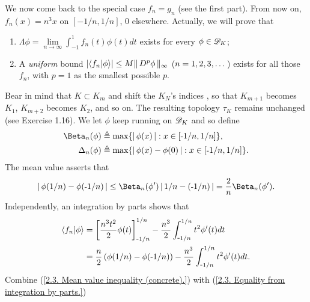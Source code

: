 We now come back to the special case $f_n = g_n$ (see the first part). %
From now on, $f_n(x) = n^3 x$ on $[\minus 1/n, 1/n]$, $0$ elsewhere. %
Actually, we will prove that 
%
  \renewcommand{\labelenumi}{(\alph{enumi})}
  \begin{enumerate}
    \item{
        $\Lambda\phi 
          = 
        \underset{n \to \infty}{\lim} \int_{\minus 1}^1 f_{n}(t)\phi(t)dt$ 
      exists for every $\phi\in{\mathscr D}_{K}$;
    }
    \item{
      A \textit{uniform} bound %
        $\lvert\bra{f_n}\ket{\phi}\rvert \leq M \| \,D^p \phi \, \|_{\infty}$ %
        ($n=1, 2, 3, \dots$) %
      exists for all those $f_n$, with $p=1$ as the smallest possible $p$.
    }
  \end{enumerate}
  \renewcommand{\labelenumi}{(\roman{enumi})}
%
%
Bear in mind that %
%
  $K \subset K_m$ %
%
and shift the $K_N$'s indices%
, so that %
%
  $K_{m+1}$ becomes $K_1$, $K_{m+2}$ becomes $K_2$, and so on. %
%
The resulting topology $\tau_K$ remains unchanged (see Exercise 1.16). %
%
We let $\phi$ keep running on ${\mathscr D}_K$ and so define %
%
  \begin{align}
    \Beta_{n}(\phi) 
      & 
        \Def  \max\set{\magnitude{\phi(x)}}{x \in [\minus 1/n, 1/n]}, \\
    \Delta_{n}(\phi) 
      & 
        \Def  \max\set{\magnitude{\phi(x) - \phi(0)}}{x \in [\minus 1/n, 1/n]}. 
  \end{align}
%
The mean value asserts that 
%
  \begin{align}\label{2.3. Mean value inequality (concrete).}
    \magnitude{ \phi(1/n) - \phi(\minus 1/n)} 
      \leq 
    \Beta_{n}(\phi')\magnitude{1/n - ({\minus}1/n)} 
      = 
    \frac{2}{n} \Beta_{n}(\phi').
  \end{align}
%
Independently, an integration by parts shows that %
%
  \begin{align}
    \bra{f_n}\ket{\phi}
      & =  
        \left[ \frac{n^3 t^2}{2} \phi(t) \right]^{1/n}_{\text{\small{-}} 1/n}
        - \frac{n^3}{2} \int_{\text{\small{-}} 1/n}^{1/n} t^{2} \phi'(t)dt\\ 
      \label{2.3. Equality from integration by parts.}
      & =  
        \frac{n}{2}\left(\phi(1/n) - \phi(\text{\small{-}} 1/n)\right)
        - \frac{n^3}{2} \int_{\text{\small{-}} 1/n}^{1/n} t^{2} \phi'(t)dt.
  \end{align}
Combine %
%
  (\ref{2.3. Mean value inequality (concrete).}) %
%
with %
  (\ref{2.3. Equality from integration by parts.})
